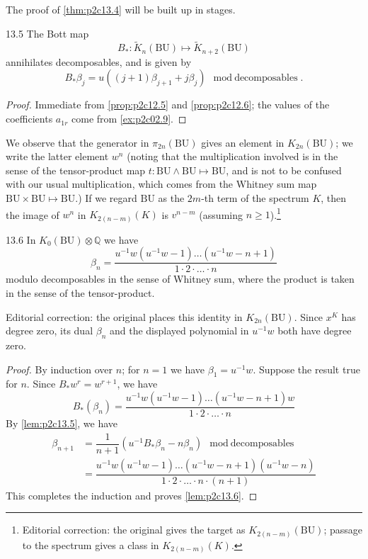 \documentclass[../main]{subfiles}
\begin{document}
The proof of \eqref{thm:p2c13.4} will be built up in stages. 
\begin{customlemma}{13.5}
\label{lem:p2c13.5}
The Bott map \[B_\ast:\widetilde{K}_n(\mathrm{BU})\mapsto\widetilde{K}_{n+2}(\mathrm{BU})\] annihilates decomposables, and is given by \[B_\ast\beta_j=u((j+1)\beta_{j+1}+j\beta_j)\mod{\text{decomposables}}.\]
\end{customlemma}
\begin{proof}
Immediate from \eqref{prop:p2c12.5} and \eqref{prop:p2c12.6}; the values of the coefficients $a_{1r}$ come from \ref{ex:p2c02.9}.
\end{proof}
We observe that the generator in $\pi_{2n}(\mathrm{BU})$ gives an element in $K_{2n}(\mathrm{BU})$; we write the latter element $w^n$ (noting that the multiplication involved is in the sense of the tensor-product map $t:\mathrm{BU}\wedge\mathrm{BU}\mapsto\mathrm{BU}$, and is not to be confused with our usual multiplication, which comes
from the Whitney sum map $\mathrm{BU}\times\mathrm{BU}\mapsto\mathrm{BU}$.) If we regard $\mathrm{BU}$ as the $2m$-th term of the spectrum $K$, then the image of $w^n$ in $K_{2(n-m)}(K)$ is $v^{n-m}$ (assuming $n\ge 1$).\footnote{Editorial correction: the original gives the target as $K_{2(n-m)}(\mathrm{BU})$; passage to the spectrum gives a class in $K_{2(n-m)}(K)$.}
\begin{customlemma}{13.6}
\label{lem:p2c13.6}
In $K_0(\mathrm{BU})\otimes\mathbb{Q}$ we have \[\beta_n = \dfrac{u^{-1}w (u^{-1}w-1)\dots(u^{-1}w-n+1)}{1\cdot 2\cdot \ldots \cdot n}\] modulo decomposables in the sense of Whitney sum, where the product
is taken in the sense of the tensor-product.
\end{customlemma}
\noindent Editorial correction: the original places this identity in $K_{2n}(\mathrm{BU})$. Since $x^K$ has degree zero, its dual $\beta_n$ and the displayed polynomial in $u^{-1}w$ both have degree zero.
\begin{proof}
By induction over $n$; for $n=1$ we have $\beta_1=u^{-1} w$. Suppose the result true for $n$. Since $B_\ast w^r = w^{r+1}$, we have \[B_\ast(\beta_n) = \dfrac{u^{-1}w (u^{-1}w-1)\dots(u^{-1}w-n+1)w}{1\cdot 2\cdot \ldots \cdot n}\]
By \eqref{lem:p2c13.5}, we have \begin{align*}
\beta_{n+1} &= \dfrac{1}{n+1}
(u^{-1} B_\ast \beta_n - n\beta_n)\mod{\text{decomposables}}\\
&= \dfrac{u^{-1}w (u^{-1}w-1)\dots(u^{-1}w-n+1)(u^{-1}w-n)}{1\cdot 2\cdot \ldots \cdot n \cdot (n+1)}
\end{align*}
This completes the induction and proves \eqref{lem:p2c13.6}.
\end{proof}
\end{document}

